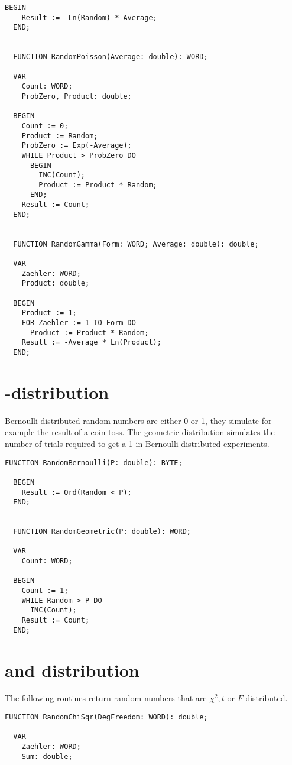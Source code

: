\begin{refsection}
\begin{lstlisting}[caption=Exponential Poisson and Gamma]
  BEGIN
    Result := -Ln(Random) * Average;
  END;


  FUNCTION RandomPoisson(Average: double): WORD;

  VAR
    Count: WORD;
    ProbZero, Product: double;

  BEGIN
    Count := 0;
    Product := Random;
    ProbZero := Exp(-Average);
    WHILE Product > ProbZero DO
      BEGIN
        INC(Count);
        Product := Product * Random;
      END;
    Result := Count;
  END;


  FUNCTION RandomGamma(Form: WORD; Average: double): double;

  VAR
    Zaehler: WORD;
    Product: double;

  BEGIN
    Product := 1;
    FOR Zaehler := 1 TO Form DO
      Product := Product * Random;
    Result := -Average * Ln(Product);
  END;
\end{lstlisting}

\section{-distribution}

Bernoulli-distributed random numbers are either 0 or 1, they simulate for example the result of a coin toss. The geometric distribution simulates the number of trials required to get a 1 in Bernoulli-distributed experiments.
\begin{lstlisting}[caption=Geometric and Bernoulli]
  FUNCTION RandomBernoulli(P: double): BYTE;

  BEGIN
    Result := Ord(Random < P);
  END;


  FUNCTION RandomGeometric(P: double): WORD;

  VAR
    Count: WORD;

  BEGIN
    Count := 1;
    WHILE Random > P DO
      INC(Count);
    Result := Count;
  END;
\end{lstlisting}

\section{ and  distribution}

The following routines return random numbers that are \(\chi^2, t \) or \(F \)-distributed.
\begin{lstlisting}[caption=Distribution for decission statistics]
  FUNCTION RandomChiSqr(DegFreedom: WORD): double;

  VAR
    Zaehler: WORD;
    Sum: double;


\end{lstlisting}
\end{refsection}

